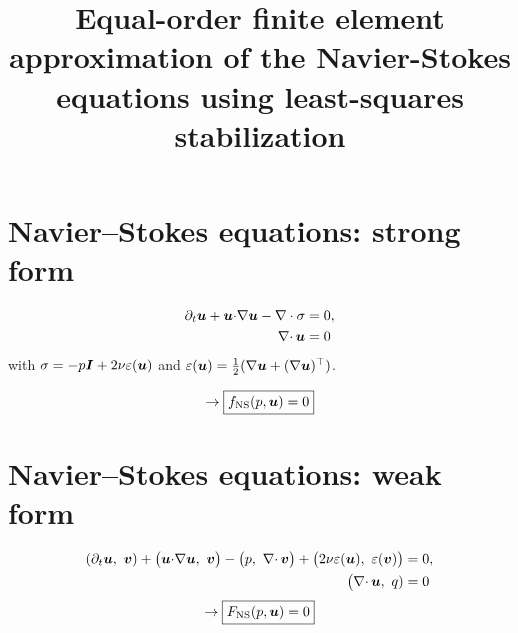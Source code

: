 \documentclass[onefignum,onetabnum]{siamart190516}
\title{Equal-order finite element approximation of the Navier-Stokes equations using least-squares stabilization}
\begin{document}
\maketitle


\renewcommand{\thefootnote}{\fnsymbol{footnote}} 
\renewcommand{\thefootnote}{\arabic{footnote}}

\tableofcontents

%
%

\pagestyle{myheadings}
\thispagestyle{plain}

\section{Navier--Stokes equations: strong form}


\begin{equation}
  \begin{aligned}
    \partial_t {\boldsymbol u}  + {\boldsymbol u} {\cdot} \nabla {\boldsymbol u} 
    - \nabla \cdot \sigma &=0, \\
    \hspace{2.2em} 
    \nabla{\cdot\,} {\boldsymbol u}&= 0 
  \end{aligned}
\end{equation}
with $\sigma = -p \bm I + 2 \nu \varepsilon({\boldsymbol u})$ and
$\varepsilon({\boldsymbol u})=\frac{1}{2}(\nabla {\boldsymbol u} + (\nabla {\boldsymbol u})^\top)$.

\begin{align*} 
\rightarrow \boxed{f_{\text{NS}}(p,{\boldsymbol u})= 0}
\end{align*}

\section{Navier--Stokes equations: weak form}


\begin{equation}
  \begin{aligned}
    \left( \partial_t {\boldsymbol u} ,\  {\boldsymbol v} \right) 
    + \big( {\boldsymbol u} {\cdot} \nabla {\boldsymbol u},\ {\boldsymbol v} \big)
    - \big( p,\ \nabla{\cdot\,} {\boldsymbol v} \big) + 
    \big(2 \nu \varepsilon({\boldsymbol u}),\ \varepsilon({\boldsymbol v}) \big)&=0, \\
    \big( \nabla{\cdot\,} {\boldsymbol u},\ q)&  = 0 
  \end{aligned}
\end{equation}
\begin{align*} 
\rightarrow \boxed{F_{\text{NS}}(p,{\boldsymbol u})= 0}
\end{align*}
\end{document}
